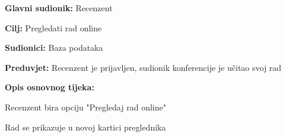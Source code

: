 	\noindent {}
	\begin{packed_item}
		
		\item \textbf{Glavni sudionik: }Recenzent
		\item  \textbf{Cilj:} Pregledati rad online
		\item  \textbf{Sudionici:} Baza podataka
		\item  \textbf{Preduvjet:} Recenzent je prijavljen, sudionik konferencije je učitao svoj rad
		\item  \textbf{Opis osnovnog tijeka:}
		
		\item[] \begin{packed_enum}
			
			\item  Recenzent bira opciju "Pregledaj rad online"
			\item Rad se prikazuje u novoj kartici preglednika
			
		\end{packed_enum}
	\end{packed_item}

